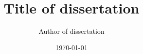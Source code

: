 
\title{Title of dissertation}
\author{Author of dissertation}
\date{\today}





\pagestyle{plain}

\frontmatter


\maketitlepg
\makecopyrightpage
\makeabstractpg
\makededicationpg




%

% 
\newlength{\oldbaselineskip}
\setlength{\oldbaselineskip}{\the\baselineskip}
\newlength{\oldparskip}
\setlength{\oldparskip}{\the\parskip}

\setlength{\baselineskip}{0.5\oldbaselineskip}
\setlength{\parskip}{0.5\oldbaselineskip}




\renewcommand{\contentsname}{TABLE OF CONTENTS}
\renewcommand{\cfttoctitlefont}{\textbf}
\renewcommand{\cftaftertoctitle}{\hfill}
\renewcommand{\cftdotsep}{1.5}
\cftsetrmarg{1.0in}

